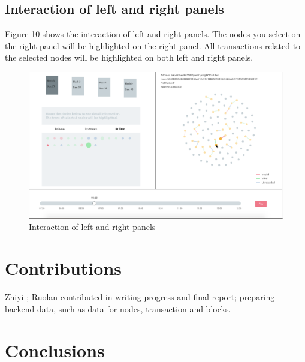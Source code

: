 \documentclass[journal, a4paper]{IEEEtran}
\begin{document}
\subsection{Interaction of left and right panels}
Figure 10 shows the interaction of left and right panels. The nodes you select on the right panel will be highlighted on the right panel. All transactions related to the selected nodes will be highlighted on both left and right panels.
\begin{figure}[!hbt]
		\begin{center}
		\includegraphics[width=\columnwidth]{clicknodes.png}
		\caption{Interaction of left and right panels}
		\label{fig:clicknodes}
		\end{center}
	\end{figure}

\section{Contributions}
Zhiyi ; Ruolan contributed in writing progress and final report; preparing backend data, such as data for nodes, transaction and blocks.
\section{Conclusions}
\end{document}
